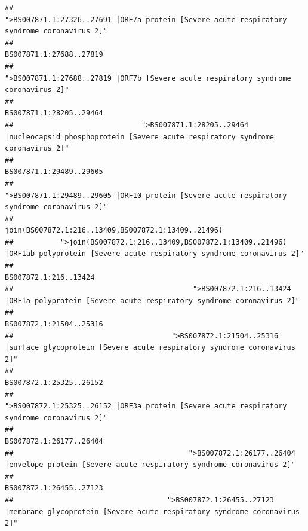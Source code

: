 \documentclass[
]{article}
\begin{document}
\begin{verbatim}
##                                            ">BS007871.1:27326..27691 |ORF7a protein [Severe acute respiratory syndrome coronavirus 2]" 
##                                                                                                                BS007871.1:27688..27819 
##                                                    ">BS007871.1:27688..27819 |ORF7b [Severe acute respiratory syndrome coronavirus 2]" 
##                                                                                                                BS007871.1:28205..29464 
##                              ">BS007871.1:28205..29464 |nucleocapsid phosphoprotein [Severe acute respiratory syndrome coronavirus 2]" 
##                                                                                                                BS007871.1:29489..29605 
##                                            ">BS007871.1:29489..29605 |ORF10 protein [Severe acute respiratory syndrome coronavirus 2]" 
##                                                                                    join(BS007872.1:216..13409,BS007872.1:13409..21496) 
##           ">join(BS007872.1:216..13409,BS007872.1:13409..21496) |ORF1ab polyprotein [Severe acute respiratory syndrome coronavirus 2]" 
##                                                                                                                  BS007872.1:216..13424 
##                                          ">BS007872.1:216..13424 |ORF1a polyprotein [Severe acute respiratory syndrome coronavirus 2]" 
##                                                                                                                BS007872.1:21504..25316 
##                                     ">BS007872.1:21504..25316 |surface glycoprotein [Severe acute respiratory syndrome coronavirus 2]" 
##                                                                                                                BS007872.1:25325..26152 
##                                            ">BS007872.1:25325..26152 |ORF3a protein [Severe acute respiratory syndrome coronavirus 2]" 
##                                                                                                                BS007872.1:26177..26404 
##                                         ">BS007872.1:26177..26404 |envelope protein [Severe acute respiratory syndrome coronavirus 2]" 
##                                                                                                                BS007872.1:26455..27123 
##                                    ">BS007872.1:26455..27123 |membrane glycoprotein [Severe acute respiratory syndrome coronavirus 2]" 

\end{verbatim}
\end{document}
